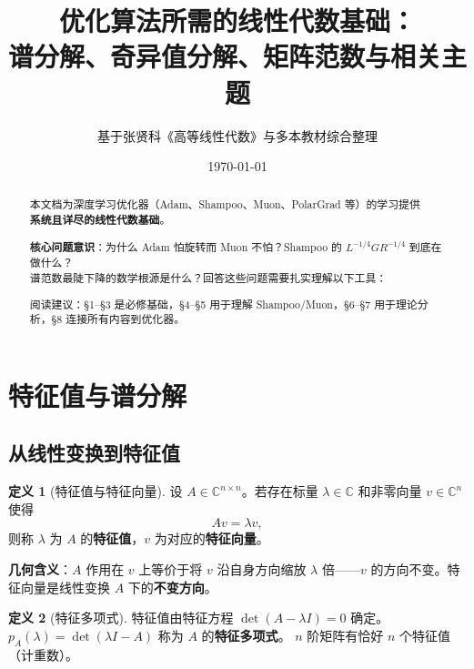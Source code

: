 \documentclass[12pt,a4paper]{ctexart}
\title{\vspace{-2cm}\textbf{优化算法所需的线性代数基础：\\[0.3em] 谱分解、奇异值分解、矩阵范数与相关主题}}
\author{基于张贤科《高等线性代数》与多本教材综合整理}
\date{\today}
\theoremstyle{definition}
\newtheorem{definition}{定义}[section]
\theoremstyle{plain}
\newcommand{\C}{\mathbb{C}}
\begin{document}
\maketitle
\thispagestyle{fancy}

\begin{abstract}
\noindent 本文档为深度学习优化器（Adam、Shampoo、Muon、PolarGrad 等）的学习提供\\
\textbf{系统且详尽的线性代数基础}。

\vspace{0.3cm}
\noindent \textbf{核心问题意识}：为什么 Adam 怕旋转而 Muon 不怕？Shampoo 的 $L^{-1/4}GR^{-1/4}$ 到底在做什么？\\
谱范数最陡下降的数学根源是什么？回答这些问题需要扎实理解以下工具：

\vspace{0.3cm}
\noindent 阅读建议：\S1--\S3 是必修基础，\S4--\S5 用于理解 Shampoo/Muon，\S6--\S7 用于理论分析，\S8 连接所有内容到优化器。
\end{abstract}

\tableofcontents

\newpage

\section{特征值与谱分解}

\subsection{从线性变换到特征值}

\begin{definition}[特征值与特征向量]
  设 $A\in\C^{n\times n}$。若存在标量 $\lambda\in\C$ 和非零向量 $v\in\C^n$ 使得
  \begin{equation}
    A v = \lambda v,
  \end{equation}
  则称 $\lambda$ 为 $A$ 的\textbf{特征值}，$v$ 为对应的\textbf{特征向量}。
\end{definition}

\textbf{几何含义}：$A$ 作用在 $v$ 上等价于将 $v$ 沿自身方向缩放 $\lambda$ 倍——$v$ 的方向不变。特征向量是线性变换 $A$ 下的\textbf{不变方向}。

\begin{definition}[特征多项式]
  特征值由特征方程 $\det(A-\lambda I)=0$ 确定。$p_A(\lambda)=\det(\lambda I-A)$ 称为 $A$ 的\textbf{特征多项式}。
  $n$ 阶矩阵有恰好 $n$ 个特征值（计重数）。
\end{definition}
\end{document}
